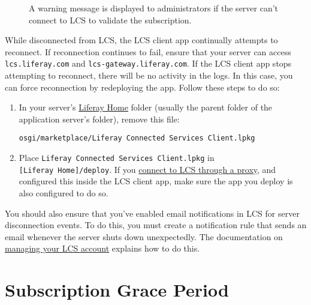 \begin{figure}
\centering
{}
\caption{A warning message is displayed to administrators if the server
can't connect to LCS to validate the subscription.}
\end{figure}

While disconnected from LCS, the LCS client app continually attempts to
reconnect. If reconnection continues to fail, ensure that your server
can access \texttt{lcs.liferay.com} and
\texttt{lcs-gateway.liferay.com}. If the LCS client app stops attempting
to reconnect, there will be no activity in the logs. In this case, you
can force reconnection by redeploying the app. Follow these steps to do
so:

\begin{enumerate}
\def\labelenumi{\arabic{enumi}.}
\item
  In your server's
  \href{/docs/7-2/deploy/-/knowledge_base/d/liferay-home}{Liferay Home}
  folder (usually the parent folder of the application server's folder),
  remove this file:

\begin{verbatim}
osgi/marketplace/Liferay Connected Services Client.lpkg
\end{verbatim}
\item
  Place \texttt{Liferay\ Connected\ Services\ Client.lpkg} in
  \texttt{{[}Liferay\ Home{]}/deploy}. If you
  \href{/docs/7-2/deploy/-/knowledge_base/d/lcs-preconfiguration\#preconfiguring-lcs-to-connect-through-a-proxy}{connect
  to LCS through a proxy}, and configured this inside the LCS client
  app, make sure the app you deploy is also configured to do so.
\end{enumerate}

You should also ensure that you've enabled email notifications in LCS
for server disconnection events. To do this, you must create a
notification rule that sends an email whenever the server shuts down
unexpectedly. The documentation on
\href{/docs/7-2/deploy/-/knowledge_base/d/managing-your-lcs-account}{managing
your LCS account} explains how to do this.

\section{Subscription Grace Period}\label{subscription-grace-period}

